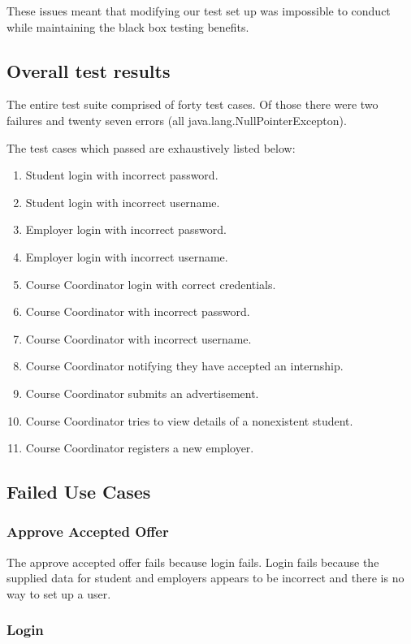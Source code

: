 \documentclass[11pt]{l3deliverable}
\begin{document}
These issues meant that modifying our test set up was impossible to conduct
while maintaining the black box testing benefits.

\subsection{Overall test results}

The entire test suite comprised of forty test cases. Of those there were two
failures and twenty seven errors (all java.lang.NullPointerExcepton).

The test cases which passed are exhaustively listed below:

\begin{enumerate}
	\item Student login with incorrect password.
	\item Student login with incorrect username.
	\item Employer login with incorrect password.
	\item Employer login with incorrect username.
	\item Course Coordinator login with correct credentials.
	\item Course Coordinator with incorrect password.
	\item Course Coordinator with incorrect username.
	\item Course Coordinator notifying they have accepted an internship.
	\item Course Coordinator submits an advertisement.
	\item Course Coordinator tries to view details of a nonexistent student.
	\item Course Coordinator registers a new employer.
\end{enumerate}

\subsection{Failed Use Cases}

\subsubsection{Approve Accepted Offer}

The approve accepted offer fails because login fails. Login fails because the
supplied data for student and employers appears to be incorrect and there is
no way to set up a user.

\subsubsection{Login}
\end{document}
